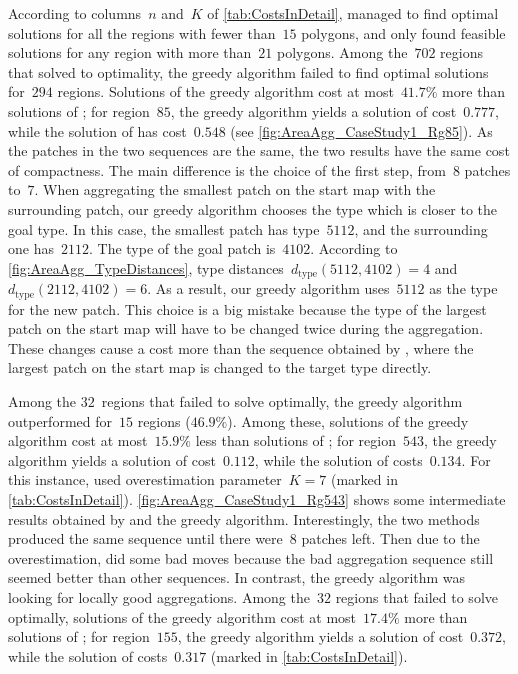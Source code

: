 According to columns~$n$ and~$K$ of \tab\ref{tab:CostsInDetail},
\AstarTwo managed to find optimal solutions 
for all the regions with fewer than~$15$ polygons,
and only found feasible solutions 
for any region with more than~$21$ polygons.
Among the~$702$ regions that 
\AstarTwo solved to optimality,
the greedy algorithm failed to 
find optimal solutions for~$294$ regions.
Solutions of the greedy algorithm cost
at most~$41.7\%$ more than 
solutions of \AstarTwo;
for region~$85$, the greedy algorithm yields 
a solution of cost~$0.777$, 
while the solution of \AstarTwo has cost~$0.548$
(see \fig\ref{fig:AreaAgg_CaseStudy1_Rg85}).
As the patches in the two sequences are the same,
the two results have the same cost of compactness.
The main difference is the choice of the first step, 
from~$8$ patches to~$7$.
When aggregating the smallest patch on the start map
with the surrounding patch,
our greedy algorithm chooses the type 
which is closer to the goal type.
In this case, the smallest patch has type~$5112$, and the 
surrounding one has~$2112$.
The type of the goal patch is~$4102$.
According to \fig\ref{fig:AreaAgg_TypeDistances},
type distances~$d_\mathrm{type}(5112,4102)=4$ and~$d_\mathrm{type}(2112,4102)=6$.
As a result, our greedy algorithm uses~$5112$ 
as the type for the new patch. 
This choice is a big mistake 
because the type of the largest patch on the start map
will have to be changed twice during the aggregation.
These changes cause a cost more than the sequence obtained by 
\AstarTwo, 
where the largest patch on the start map is changed to 
the target type directly.

Among the $32$~regions that 
\AstarTwo failed to solve optimally,
the greedy algorithm outperformed \AstarTwo 
for~$15$ regions ($46.9\%$).
%
Among these, solutions of the greedy algorithm 
cost at most~$15.9\%$ less than solutions of \AstarTwo;
for region~$543$, the greedy algorithm yields 
a solution of cost~$0.112$, 
while the solution of \AstarTwo costs~$0.134$. 
For this instance, 
\AstarTwo used overestimation parameter~$K=7$
(marked in \tab\ref{tab:CostsInDetail}).
\fig\ref{fig:AreaAgg_CaseStudy1_Rg543} shows 
some intermediate results obtained by
\AstarTwo and the greedy algorithm.
Interestingly, the two methods produced the same sequence until 
there were~$8$ patches left.
Then due to the overestimation, 
\AstarTwo did some bad moves
because the bad aggregation sequence still seemed better 
than other sequences.
In contrast, the greedy algorithm was looking for locally good 
aggregations.
%
Among the~$32$ regions that 
\AstarTwo failed to solve optimally,  
solutions of the greedy algorithm cost at most~$17.4\%$ 
more than solutions of \AstarTwo; 
for region~$155$, the greedy algorithm yields 
a solution of cost~$0.372$, while
the solution of \AstarTwo costs~$0.317$
(marked in \tab\ref{tab:CostsInDetail}).

